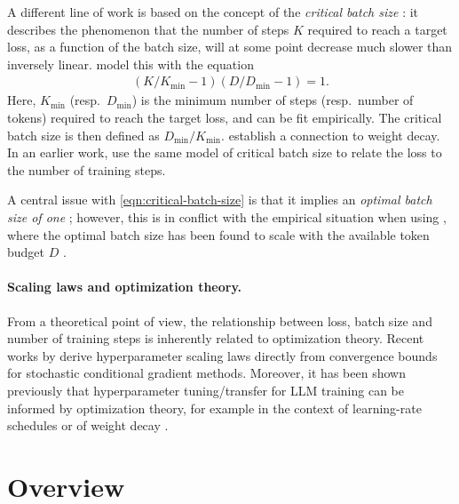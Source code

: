 \documentclass[12pt,a4paper,twoside]{article}
\begin{document}
A different line of work is based on the concept of the \emph{critical batch size} \citep{McCandlish2018,Shallue2018}: it describes the phenomenon that the number of steps $K$ required to reach a target loss, as a function of the batch size, will at some point decrease much slower than inversely linear. \citet{McCandlish2018} model this with the equation
\begin{align}\label{eqn:critical-batch-size}
    (K/K_{\min} - 1) (D/D_{\min} - 1) = 1.
\end{align}
Here, $K_{\min}$ (resp.\ $D_{\min}$) is the minimum number of steps (resp.\ number of tokens) required to reach the target loss, and can be fit empirically. The critical batch size is then defined as $D_{\min}/K_{\min}$. \citet{Bergsma2025} establish a connection to weight decay. In an earlier work, \citet{Kaplan2020} use the same model of critical batch size to relate the loss to the number of training steps. 

A central issue with \eqref{eqn:critical-batch-size} is that it implies an \emph{optimal batch size of one} \citep{Bergsma2025}; however, this is in conflict with the empirical situation when using \AdamW{}, where the optimal batch size has been found to scale with the available token budget $D$ \citep{Porian2024,Li2025}.

\paragraph{Scaling laws and optimization theory.} From a theoretical point of view, the relationship between loss, batch size and number of training steps is inherently related to optimization theory. Recent works by \citet{Shulgin2026,Islamov2026} derive hyperparameter scaling laws directly from convergence bounds for stochastic conditional gradient methods. Moreover, it has been shown previously that hyperparameter tuning/transfer for LLM training can be informed by optimization theory, for example in the context of learning-rate schedules \citep{Schaipp2025} or of weight decay \citep{Wang2025}.


\section{Overview}\label{sec:overview}
\end{document}
